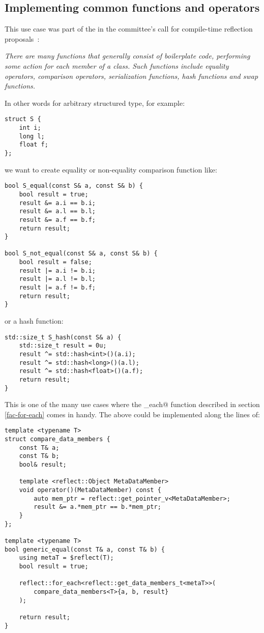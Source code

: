 \subsection{Implementing common functions and operators}
\label{use-case-common-func}

This use case was part of the  in the committee's
call for compile-time reflection proposals~\cite{ISOCPP-N3814}: 

{\em There are many functions that generally consist of boilerplate code,
performing some action for each member of a class. Such functions include
equality operators, comparison operators, serialization functions,
hash functions and swap functions.
}

In other words for arbitrary structured type, for example:

\begin{verbatim}
struct S {
	int i;
	long l;
	float f;
};
\end{verbatim}

we want to create equality or non-equality comparison function like:

\begin{verbatim}
bool S_equal(const S& a, const S& b) {
	bool result = true;
	result &= a.i == b.i;
	result &= a.l == b.l;
	result &= a.f == b.f;
	return result;
}

bool S_not_equal(const S& a, const S& b) {
	bool result = false;
	result |= a.i != b.i;
	result |= a.l != b.l;
	result |= a.f != b.f;
	return result;
}
\end{verbatim}

or a hash function:

\begin{verbatim}
std::size_t S_hash(const S& a) {
	std::size_t result = 0u;
	result ^= std::hash<int>()(a.i);
	result ^= std::hash<long>()(a.l);
	result ^= std::hash<float>()(a.f);
	return result;
}
\end{verbatim}

This is one of the many use cases where the \verb@for_each@ function
described in section \ref{fac-for-each} comes in handy. The above could be
implemented along the lines of:

\begin{verbatim}
template <typename T>
struct compare_data_members {
	const T& a;
	const T& b;
	bool& result;

	template <reflect::Object MetaDataMember>
	void operator()(MetaDataMember) const {
		auto mem_ptr = reflect::get_pointer_v<MetaDataMember>;
		result &= a.*mem_ptr == b.*mem_ptr;
	}
};

template <typename T>
bool generic_equal(const T& a, const T& b) {
	using metaT = $reflect(T);
	bool result = true;

	reflect::for_each<reflect::get_data_members_t<metaT>>(
		compare_data_members<T>{a, b, result}
	);

	return result;
}
\end{verbatim}

